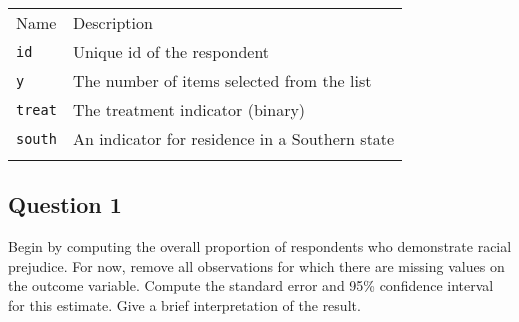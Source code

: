 \documentclass[]{article}
\begin{document}
\begin{longtable}[c]{@{}ll@{}}
\toprule\addlinespace
\begin{minipage}[b]{0.24\columnwidth}\raggedright
Name
\end{minipage} & \begin{minipage}[b]{0.69\columnwidth}\raggedright
Description
\end{minipage}
\\\addlinespace
\midrule\endhead
\begin{minipage}[t]{0.24\columnwidth}\raggedright
\texttt{id}
\end{minipage} & \begin{minipage}[t]{0.69\columnwidth}\raggedright
Unique id of the respondent
\end{minipage}
\\\addlinespace
\begin{minipage}[t]{0.24\columnwidth}\raggedright
\texttt{y}
\end{minipage} & \begin{minipage}[t]{0.69\columnwidth}\raggedright
The number of items selected from the list
\end{minipage}
\\\addlinespace
\begin{minipage}[t]{0.24\columnwidth}\raggedright
\texttt{treat}
\end{minipage} & \begin{minipage}[t]{0.69\columnwidth}\raggedright
The treatment indicator (binary)
\end{minipage}
\\\addlinespace
\begin{minipage}[t]{0.24\columnwidth}\raggedright
\texttt{south}
\end{minipage} & \begin{minipage}[t]{0.69\columnwidth}\raggedright
An indicator for residence in a Southern state
\end{minipage}
\\\addlinespace
\bottomrule
\end{longtable}

\subsection{Question 1}\label{question-1}

Begin by computing the overall proportion of respondents who demonstrate
racial prejudice. For now, remove all observations for which there are
missing values on the outcome variable. Compute the standard error and
95\% confidence interval for this estimate. Give a brief interpretation
of the result.
\end{document}
